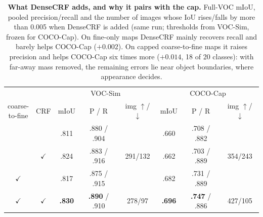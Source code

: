 \begin{table}[t]
\centering
\footnotesize\setlength{\tabcolsep}{2.6pt}
\begin{tabular}{@{}cc|ccc|ccc@{}}
\toprule
\multicolumn{2}{c|}{} & \multicolumn{3}{c|}{VOC-Sim} & \multicolumn{3}{c}{COCO-Cap}\\
\shortstack{coarse-\\to-fine} & CRF & mIoU & P / R & img $\uparrow$/$\downarrow$ & mIoU & P / R & img $\uparrow$/$\downarrow$ \\
\midrule
 & & .811 & .880 / .904 & & .660 & .708 / .882 & \\
 & $\checkmark$ & .824 & .883 / .916 & 291/132 & .662 & .703 / .889 & 354/243 \\
$\checkmark$ & & .817 & .875 / .915 & & .682 & .731 / .889 & \\
$\checkmark$ & $\checkmark$ & \textbf{.830} & \textbf{.890} / .910 & 278/97 & \textbf{.696} & \textbf{.747} / .886 & 427/105 \\
\bottomrule
\end{tabular}
\caption{\textbf{What DenseCRF adds, and why it pairs with the cap.} Full-VOC mIoU, pooled precision/recall and the number of images whose IoU rises/falls by more than 0.005 when DenseCRF is added (same run; thresholds from VOC-Sim, frozen for COCO-Cap). On fine-only maps DenseCRF mainly recovers recall and barely helps COCO-Cap ($+0.002$). On capped coarse-to-fine maps it raises precision and helps COCO-Cap six times more ($+0.014$, 18 of 20 classes): with far-away mass removed, the remaining errors lie near object boundaries, where appearance decides.}
\label{tab:refine}
\end{table}
